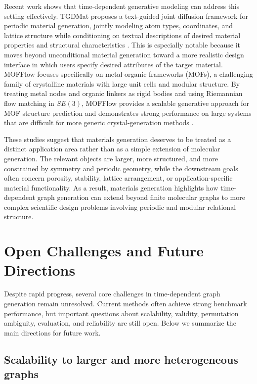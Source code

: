 \documentclass{article}
\begin{document}
Recent work shows that time-dependent generative modeling can address this setting effectively. TGDMat proposes a text-guided joint diffusion framework for periodic material generation, jointly modeling atom types, coordinates, and lattice structure while conditioning on textual descriptions of desired material properties and structural characteristics \cite{das2025tgdmat}. This is especially notable because it moves beyond unconditional material generation toward a more realistic design interface in which users specify desired attributes of the target material. MOFFlow focuses specifically on metal-organic frameworks (MOFs), a challenging family of crystalline materials with large unit cells and modular structure. By treating metal nodes and organic linkers as rigid bodies and using Riemannian flow matching in $SE(3)$, MOFFlow provides a scalable generative approach for MOF structure prediction and demonstrates strong performance on large systems that are difficult for more generic crystal-generation methods \cite{kim2025mofflow}.

These studies suggest that materials generation deserves to be treated as a distinct application area rather than as a simple extension of molecular generation. The relevant objects are larger, more structured, and more constrained by symmetry and periodic geometry, while the downstream goals often concern porosity, stability, lattice arrangement, or application-specific material functionality. As a result, materials generation highlights how time-dependent graph generation can extend beyond finite molecular graphs to more complex scientific design problems involving periodic and modular relational structure.



\section{Open Challenges and Future Directions}
\label{sec:open_challenges}

Despite rapid progress, several core challenges in time-dependent graph generation remain unresolved. Current methods often achieve strong benchmark performance, but important questions about scalability, validity, permutation ambiguity, evaluation, and reliability are still open. Below we summarize the main directions for future work.

\subsection{Scalability to larger and more heterogeneous graphs}
\end{document}
